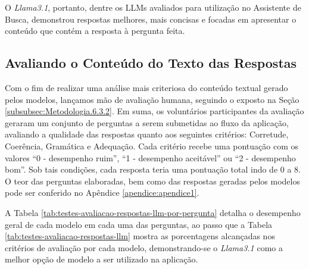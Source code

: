 O \textit{Llama3.1}, portanto, dentre os \ac{LLM}s avaliados para utilização no Assistente de Busca, demonstrou respostas melhores, mais concisas e focadas em apresentar o conteúdo que contém a resposta à pergunta feita.



\subsection{Avaliando o Conteúdo do Texto das Respostas}
\label{subsec:Resultados.3.2}

Com o fim de realizar uma análise mais criteriosa do conteúdo textual gerado pelos modelos, lançamos mão de avaliação humana, seguindo o exposto na Seção \ref{subsubsec:Metodologia.6.3.2}. Em suma, os voluntários participantes da avaliação geraram um conjunto de perguntas a serem submetidas ao fluxo da aplicação, avaliando a qualidade das respostas quanto aos seguintes critérios: Corretude, Coerência, Gramática e Adequação. Cada critério recebe uma pontuação com os valores ``0 - desempenho ruim'',  ``1 - desempenho aceitável'' ou ``2 - desempenho bom''. Sob tais condições, cada resposta teria uma pontuação total indo de 0 a 8.  O teor das perguntas elaboradas, bem como das respostas geradas pelos modelos pode ser conferido no Apêndice \ref{apendice:apendice1}.

A Tabela \ref{tab:testes-avaliacao-respostas-llm-por-pergunta} detalha o desempenho geral de cada modelo em cada uma das perguntas, ao passo que a Tabela \ref{tab:testes-avaliacao-respostas-llm} mostra as porcentagens alcançadas nos critérios de avaliação por cada modelo, demonstrando-se o \textit{Llama3.1} como a melhor opção de modelo a ser utilizado na aplicação.

